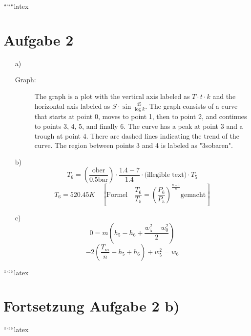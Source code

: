 
``````latex


\section*{Aufgabe 2}

\begin{itemize}
    \item[a)] 
    \begin{description}
        \item[Graph:] 
        The graph is a plot with the vertical axis labeled as $T \cdot t \cdot k$ and the horizontal axis labeled as $S \cdot \sin \frac{45}{\log k}$. The graph consists of a curve that starts at point 0, moves to point 1, then to point 2, and continues to points 3, 4, 5, and finally 6. The curve has a peak at point 3 and a trough at point 4. There are dashed lines indicating the trend of the curve. The region between points 3 and 4 is labeled as "3sobaren".
    \end{description}
    
    \item[b)] 
    \[
    T_6 = \left( \frac{\text{ober}}{0.5 \text{bar}} \right) \cdot \frac{1.4 - 7}{1.4} \cdot \text{(illegible text)} \cdot T_5
    \]
    \[
    T_6 = 520.45 K \quad \left[ \text{Formel} \quad \frac{T_6}{T_5} = \left( \frac{P_6}{P_5} \right)^{\frac{n-1}{n}} \text{gemacht} \right]
    \]
    
    \item[c)] 
    \[
    0 = m \left( h_5 - h_6 + \frac{w_5^2 - w_0^2}{2} \right)
    \]
    \[
    -2 \left( \frac{T_m}{n} - h_5 + h_6 \right) + w_5^2 = w_6
    \]
\end{itemize}

``````latex


\section*{Fortsetzung Aufgabe 2 b)}

``````latex


